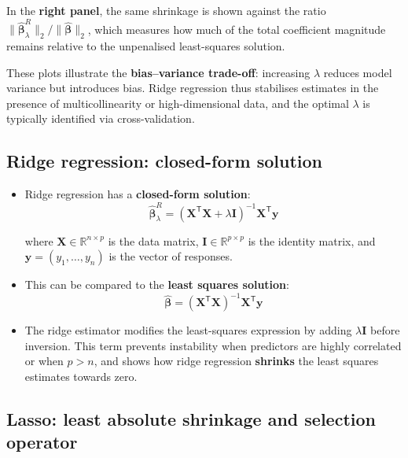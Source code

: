 \documentclass[
  letterpaper,
  DIV=11,
  numbers=noendperiod]{scrartcl}
\begin{document}
In the \textbf{right panel}, the same shrinkage is shown against the
ratio
\(\|\hat{\boldsymbol{\beta}}^{R}_{\lambda}\|_2 / \|\hat{\boldsymbol{\beta}}\|_2\),
which measures how much of the total coefficient magnitude remains
relative to the unpenalised least-squares solution.

These plots illustrate the \textbf{bias--variance trade-off}: increasing
\(\lambda\) reduces model variance but introduces bias. Ridge regression
thus stabilises estimates in the presence of multicollinearity or
high-dimensional data, and the optimal \(\lambda\) is typically
identified via cross-validation.

\subsection{Ridge regression: closed-form
solution}\label{ridge-regression-closed-form-solution}

\begin{itemize}
\item
  Ridge regression has a \textbf{closed-form solution}:
  \[\hat{\boldsymbol{\beta}}^{R}_{\lambda} = (\mathbf{X}^{\mathsf{T}}\mathbf{X} + \lambda \mathbf{I})^{-1}\mathbf{X}^{\mathsf{T}}\mathbf{y}\]

  where \(\mathbf{X} \in \mathbb{R}^{n \times p}\) is the data matrix,
  \(\mathbf{I} \in \mathbb{R}^{p \times p}\) is the identity matrix, and
  \(\mathbf{y} = (y_1, \dots, y_n)\) is the vector of responses.
\item
  This can be compared to the \textbf{least squares solution}:
  \[\hat{\boldsymbol{\beta}} = (\mathbf{X}^{\mathsf{T}}\mathbf{X})^{-1}\mathbf{X}^{\mathsf{T}}\mathbf{y}\]
\item
  The ridge estimator modifies the least-squares expression by adding
  \(\lambda \mathbf{I}\) before inversion. This term prevents
  instability when predictors are highly correlated or when \(p > n\),
  and shows how ridge regression \textbf{shrinks} the least squares
  estimates towards zero.
\end{itemize}

\subsection{Lasso: least absolute shrinkage and selection
operator}\label{lasso-least-absolute-shrinkage-and-selection-operator}
\end{document}
